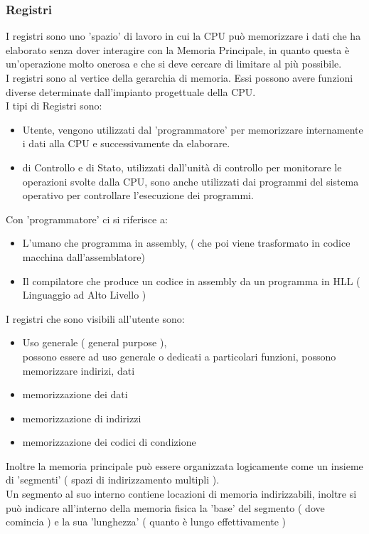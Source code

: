 \documentclass[arch.tex]{subfiles}
\begin{document}
\subsubsection{Registri}
I registri sono uno 'spazio' di lavoro in cui la CPU può memorizzare i dati che ha 
elaborato senza dover interagire con la Memoria Principale, in quanto questa è un'operazione
molto onerosa e che si deve cercare di limitare al più possibile.\\
I registri sono al vertice della gerarchia di memoria. Essi possono avere funzioni diverse
determinate dall'impianto progettuale della CPU.\\

I tipi di Registri sono:

\begin{itemize}
	\item Utente, vengono utilizzati dal 'programmatore' per memorizzare internamente
		i dati alla CPU e successivamente da elaborare.
	\item di Controllo e di Stato, utilizzati dall'unità di controllo per monitorare
		le operazioni svolte dalla CPU, sono anche utilizzati dai programmi del sistema
		operativo per controllare l'esecuzione dei programmi.
\end{itemize}
Con 'programmatore' ci si riferisce a:

\begin{itemize}
	\item L'umano che programma in assembly, ( che poi viene trasformato in codice macchina
		dall'assemblatore)
	\item Il compilatore che produce un codice in assembly da un programma in HLL 
		( Linguaggio ad Alto Livello ) 
\end{itemize}
I registri che sono visibili all'utente sono:

\begin{itemize}
	\item Uso generale ( general purpose ),\\
		possono essere ad uso generale o dedicati a particolari funzioni, possono
		memorizzare indirizi, dati
	\item memorizzazione dei dati
	\item memorizzazione di indirizzi
	\item memorizzazione dei codici di condizione
\end{itemize}
Inoltre la memoria principale può essere organizzata logicamente come un insieme di
'segmenti' ( spazi di indirizzamento multipli ).\\
Un segmento al suo interno contiene locazioni di memoria indirizzabili, inoltre si può indicare
all'interno della memoria fisica la 'base' del segmento ( dove comincia ) e la sua
'lunghezza' ( quanto è lungo effettivamente ) 
\end{document}
